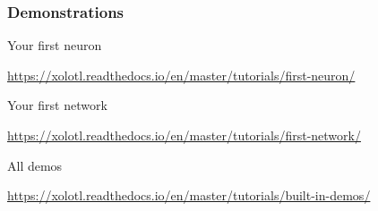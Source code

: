 \documentclass{beamer}
\begin{document}
\begin{frame}
  \frametitle{Demonstrations}

  Your first neuron

  \medskip

  \url{https://xolotl.readthedocs.io/en/master/tutorials/first-neuron/}

  \medskip
  Your first network
  \medskip

  \url{https://xolotl.readthedocs.io/en/master/tutorials/first-network/}

  \medskip
  All demos
  \medskip

  \url{https://xolotl.readthedocs.io/en/master/tutorials/built-in-demos/}\medskip

\end{frame}
\end{document}
